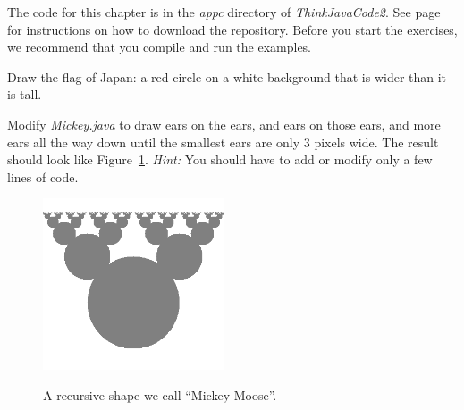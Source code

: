 The code for this chapter is in the {\it appc} directory of {\it ThinkJavaCode2}.
See page~\pageref{code} for instructions on how to download the repository.
Before you start the exercises, we recommend that you compile and run the examples.


\begin{exercise}

Draw the flag of Japan: a red circle on a white background that is wider than it is tall.

\end{exercise}


\begin{exercise}

Modify {\it Mickey.java} to draw ears on the ears, and ears on those ears, and more ears all the way down until the smallest ears are only 3 pixels wide.
The result should look like Figure~\ref{fig.moose}.
%
{\em Hint:} You should have to add or modify only a few lines of code.

\begin{figure}[!ht]
\begin{center}
\includegraphics[height=2in,alt={Recursive Mickey Mouse pattern called Mickey Moose, with ears on ears creating a fractal-like structure of progressively smaller ovals}]{figs/moose.png}
\caption{A recursive shape we call ``Mickey Moose''.}
\label{fig.moose}
\end{center}
\end{figure}

\end{exercise}


